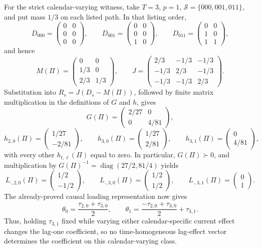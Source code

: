 For the strict calendar-varying witness, take \(T=3\), \(p=1\), \(\mathcal S=\{000,001,011\}\), and put mass \(1/3\) on each listed path.  In that listing order,
\[
 D_{000}=\begin{pmatrix}0&0\\0&0\\0&0\end{pmatrix},\qquad
 D_{001}=\begin{pmatrix}0&0\\0&0\\1&0\end{pmatrix},\qquad
 D_{011}=\begin{pmatrix}0&0\\1&0\\1&1\end{pmatrix},
\]
and hence
\[
 M(\Pi)=\begin{pmatrix}0&0\\1/3&0\\2/3&1/3\end{pmatrix},\qquad
 J=\begin{pmatrix}2/3&-1/3&-1/3\\-1/3&2/3&-1/3\\-1/3&-1/3&2/3\end{pmatrix}.
\]
Substitution into \(R_s=J(D_s-M(\Pi))\), followed by finite matrix multiplication in the definitions of \(G\) and \(h\), gives
\[
 G(\Pi)=\begin{pmatrix}2/27&0\\0&4/81\end{pmatrix},
\]
\[
 h_{2,0}(\Pi)=\begin{pmatrix}1/27\\-2/81\end{pmatrix},\qquad
 h_{3,0}(\Pi)=\begin{pmatrix}1/27\\2/81\end{pmatrix},\qquad
 h_{3,1}(\Pi)=\begin{pmatrix}0\\4/81\end{pmatrix},
\]
with every other \(h_{t,\ell}(\Pi)\) equal to zero.  In particular, \(G(\Pi)\succ0\), and multiplication by
\(G(\Pi)^{-1}=\operatorname{diag}(27/2,81/4)\) yields
\[
 L_{\cdot,2,0}(\Pi)=\begin{pmatrix}1/2\\-1/2\end{pmatrix},\qquad
 L_{\cdot,3,0}(\Pi)=\begin{pmatrix}1/2\\1/2\end{pmatrix},\qquad
 L_{\cdot,3,1}(\Pi)=\begin{pmatrix}0\\1\end{pmatrix}.
\]
The already-proved causal loading representation now gives
\[
 \theta_0=\frac{\tau_{2,0}+\tau_{3,0}}{2},\qquad
 \theta_1=\frac{-\tau_{2,0}+\tau_{3,0}}{2}+\tau_{3,1}.
\]
Thus, holding \(\tau_{3,1}\) fixed while varying either calendar-specific current effect changes the lag-one coefficient, so no time-homogeneous lag-effect vector determines the coefficient on this calendar-varying class.


